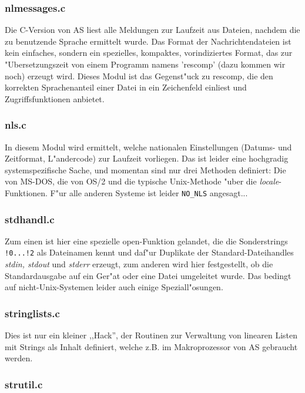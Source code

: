 \documentclass[12pt,a4paper,twoside]{report}
\newcommand{\asname}{AS}
\begin{document}
\subsubsection{nlmessages.c}

Die C-Version von \asname{} liest alle Meldungen zur Laufzeit aus Dateien, nachdem
die zu benutzende Sprache ermittelt wurde.  Das Format der
Nachrichtendateien ist kein einfaches, sondern ein spezielles, kompaktes,
vorindiziertes Format, das zur "Ubersetzungszeit von einem Programm namens
'rescomp' (dazu kommen wir noch) erzeugt wird.  Dieses Modul ist das
Gegenst"uck zu rescomp, die den korrekten Sprachenanteil einer Datei in ein
Zeichenfeld einliest und Zugriffsfunktionen anbietet.

\subsubsection{nls.c}

In diesem Modul wird ermittelt, welche nationalen Einstellungen (Datums-
und Zeitformat, L"andercode) zur Laufzeit vorliegen.  Das ist leider eine
hochgradig systemspezifische Sache, und momentan sind nur drei Methoden
definiert: Die von MS-DOS, die von OS/2 und die typische Unix-Methode
"uber die {\em locale}-Funktionen.  F"ur alle anderen Systeme ist leider
\verb!NO_NLS! angesagt...

\subsubsection{stdhandl.c}

Zum einen ist hier eine spezielle open-Funktion gelandet, die die
Sonderstrings {\tt !0...!2} als Dateinamen kennt und daf"ur Duplikate der
Standard-Dateihandles {\em stdin, stdout} und {\em stderr} erzeugt, zum
anderen wird hier festgestellt, ob die Standardausgabe auf ein Ger"at oder
eine Datei umgeleitet wurde.  Das bedingt auf nicht-Unix-Systemen leider
auch einige Speziall"osungen.

\subsubsection{stringlists.c}

Dies ist nur ein kleiner ,,Hack'', der Routinen zur Verwaltung von linearen
Listen mit Strings als Inhalt definiert, welche z.B. im Makroprozessor von
\asname{} gebraucht werden.

\subsubsection{strutil.c}
\end{document}
